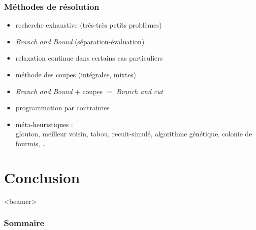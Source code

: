 \documentclass{beamer}
\begin{document}

\begin{frame}
  \frametitle{Méthodes de résolution}

  \begin{itemize}
  \item recherche exhaustive (très-très petits problèmes)
  \item \alert{\emph{Branch and Bound}} (séparation-évaluation)
  \item relaxation continue dans certains cas particuliers
  \item méthode des coupes (intégrales, mixtes)
  \item \emph{Branch and Bound} + coupes $=$ \emph{Branch and cut}
  \item programmation par contraintes
  \item méta-heuristiques : \\
      glouton, meilleur voisin, tabou, recuit-simulé, algorithme génétique, colonie de fourmis, \dots
  \end{itemize}
  
\end{frame}


\section{Conclusion}

\begin{frame}<beamer>
  \frametitle{Sommaire}
  \tableofcontents[currentsection]
\end{frame}
\end{document}
